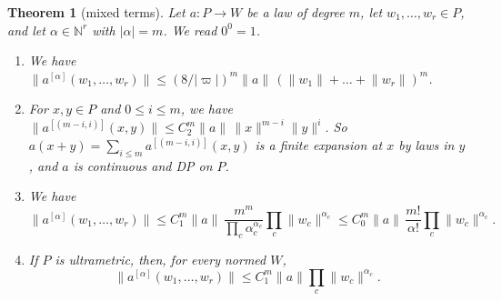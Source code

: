 \documentclass[11pt]{amsart}
\newtheorem{theorem}{Theorem}[section]
\theoremstyle{definition}
\theoremstyle{remark}
\numberwithin{equation}{section}
\newcommand{\N}{\mathbb N}
\newcommand{\abs}[1]{\lvert #1\rvert}
\newcommand{\norm}[1]{\lVert #1\rVert}
\theoremstyle{plain}
\theoremstyle{definition}
\theoremstyle{plain}
\begin{document}
\begin{theorem}[mixed terms]\label{dp:thm:mixed}
Let $a\colon P\to W$ be a law of degree $m$, let $w_1,\dots,w_r\in P$, and let $\alpha\in\N^r$ with $\abs\alpha=m$. We read $0^0=1$.
\begin{enumerate}
\item We have $\norm{a^{[\alpha]}(w_1,\dots,w_r)}\le(8/\abs\varpi)^m\norm a\,(\norm{w_1}+\dots+\norm{w_r})^m$.
\item For $x,y\in P$ and $0\le i\le m$, we have $\norm{a^{[(m-i,i)]}(x,y)}\le C_2^m\norm a\,\norm x^{m-i}\norm y^i$. So $a(x+y)=\sum_{i\le m}a^{[(m-i,i)]}(x,y)$ is a finite expansion at $x$ by laws in $y$, and $a$ is continuous and DP on $P$.
\item We have
\begin{equation}\label{dp:laws:scaled}
 \norm{a^{[\alpha]}(w_1,\dots,w_r)}\le C_1^m\norm a\,\frac{m^m}{\prod_c\alpha_c^{\alpha_c}}\prod_c\norm{w_c}^{\alpha_c}\le C_0^m\norm a\,\frac{m!}{\alpha!}\prod_c\norm{w_c}^{\alpha_c}.
\end{equation}
\item If $P$ is ultrametric, then, for every normed $W$,
\begin{equation}\label{dp:laws:ultrametric}
 \norm{a^{[\alpha]}(w_1,\dots,w_r)}\le C_1^m\norm a\prod_c\norm{w_c}^{\alpha_c}.
\end{equation}
\end{enumerate}
\end{theorem}
\end{document}
